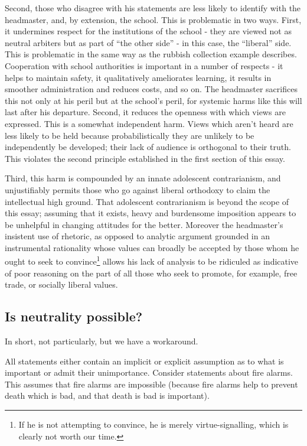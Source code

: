 \documentclass[10pt,a4paper]{article}
\begin{document}
\begin{multicols}{2}
	Second, those who disagree with his statements are less likely to
	identify with the headmaster, and, by extension, the school. This is
	problematic in two ways. First, it undermines respect for the
	institutions of the school - they are viewed not as neutral arbiters but
	as part of ``the other side'' - in this case, the ``liberal'' side. This
	is problematic in the same way as the rubbish collection example
	describes. Cooperation with school authorities is important in a number
	of respects - it helps to maintain safety, it qualitatively ameliorates
	learning, it results in smoother administration and reduces costs, and
	so on. The headmaster sacrifices this not only at his peril but at the
	school's peril, for systemic harms like this will last after his
	departure. Second, it reduces the openness with which views are
	expressed. This is a somewhat independent harm. Views which aren't heard
	are less likely to be held because probabilistically they are unlikely
	to be independently be developed; their lack of audience is orthogonal
	to their truth. This violates the second principle established in the
	first section of this essay.
	
	Third, this harm is compounded by an innate adolescent contrarianism,
	and unjustifiably permits those who go against liberal orthodoxy to
	claim the intellectual high ground. That adolescent contrarianism is
	beyond the scope of this essay; assuming that it exists, heavy and
	burdensome imposition appears to be unhelpful in changing attitudes for
	the better. Moreover the headmaster's insistent use of rhetoric, as
	opposed to analytic argument grounded in an instrumental rationality
	whose values can broadly be accepted by those whom he ought to seek to
	convince\footnote{If he is not attempting to convince, he is merely
		virtue-signalling, which is clearly not worth our time.} allows his
	lack of analysis to be ridiculed as indicative of poor reasoning on the
	part of all those who seek to promote, for example, free trade, or
	socially liberal values.
	
	\subsection{Is neutrality possible?}\label{is-neutrality-possible}
	
	In short, not particularly, but we have a workaround.
	
	All statements either contain an implicit or explicit assumption as to
	what is important or admit their unimportance. Consider statements about
	fire alarms. This assumes that fire alarms are impossible (because fire
	alarms help to prevent death which is bad, and that death is bad is
	important).
	

\end{multicols}
\end{document}
